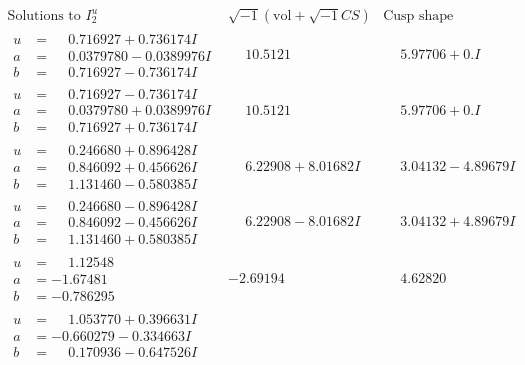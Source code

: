 \documentclass[1p]{elsarticle_modified}
\theoremstyle{definition}
\newcommand{\I}{\sqrt{-1}}
\begin{document}
$$\begin{array}{c|c|c}  
\text{Solutions to }I^u_{2}& \I (\text{vol} + \sqrt{-1}CS) & \text{Cusp shape}\\
 \hline 
\begin{aligned}
u &= \phantom{-}0.716927 + 0.736174 I \\
a &= \phantom{-}0.0379780 - 0.0389976 I \\
b &= \phantom{-}0.716927 - 0.736174 I\end{aligned}
 & \phantom{-}10.5121\phantom{ +0.000000I} & \phantom{-}5.97706 + 0. I\phantom{ +0.000000I} \\ \hline\begin{aligned}
u &= \phantom{-}0.716927 - 0.736174 I \\
a &= \phantom{-}0.0379780 + 0.0389976 I \\
b &= \phantom{-}0.716927 + 0.736174 I\end{aligned}
 & \phantom{-}10.5121\phantom{ +0.000000I} & \phantom{-}5.97706 + 0. I\phantom{ +0.000000I} \\ \hline\begin{aligned}
u &= \phantom{-}0.246680 + 0.896428 I \\
a &= \phantom{-}0.846092 + 0.456626 I \\
b &= \phantom{-}1.131460 - 0.580385 I\end{aligned}
 & \phantom{-}6.22908 + 8.01682 I & \phantom{-}3.04132 - 4.89679 I \\ \hline\begin{aligned}
u &= \phantom{-}0.246680 - 0.896428 I \\
a &= \phantom{-}0.846092 - 0.456626 I \\
b &= \phantom{-}1.131460 + 0.580385 I\end{aligned}
 & \phantom{-}6.22908 - 8.01682 I & \phantom{-}3.04132 + 4.89679 I \\ \hline\begin{aligned}
u &= \phantom{-}1.12548\phantom{ +0.000000I} \\
a &= -1.67481\phantom{ +0.000000I} \\
b &= -0.786295\phantom{ +0.000000I}\end{aligned}
 & -2.69194\phantom{ +0.000000I} & \phantom{-}4.62820\phantom{ +0.000000I} \\ \hline\begin{aligned}
u &= \phantom{-}1.053770 + 0.396631 I \\
a &= -0.660279 - 0.334663 I \\
b &= \phantom{-}0.170936 - 0.647526 I\end{aligned}

\end{array}$$
\end{document}

